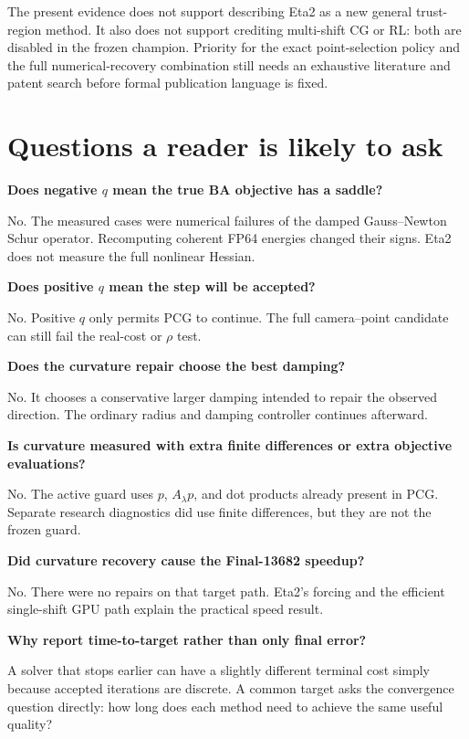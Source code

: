 \documentclass[11pt]{article}
\begin{document}
The present evidence does not support describing Eta2 as a new general trust-region method.  It also does not support crediting multi-shift CG or RL: both are disabled in the frozen champion.  Priority for the exact point-selection policy and the full numerical-recovery combination still needs an exhaustive literature and patent search before formal publication language is fixed.

\section{Questions a reader is likely to ask}

\textbf{Does negative $q$ mean the true BA objective has a saddle?}

No.  The measured cases were numerical failures of the damped Gauss--Newton Schur operator.  Recomputing coherent FP64 energies changed their signs.  Eta2 does not measure the full nonlinear Hessian.

\textbf{Does positive $q$ mean the step will be accepted?}

No.  Positive $q$ only permits PCG to continue.  The full camera--point candidate can still fail the real-cost or $\rho$ test.

\textbf{Does the curvature repair choose the best damping?}

No.  It chooses a conservative larger damping intended to repair the observed direction.  The ordinary radius and damping controller continues afterward.

\textbf{Is curvature measured with extra finite differences or extra objective evaluations?}

No.  The active guard uses $p$, $A_\lambda p$, and dot products already present in PCG.  Separate research diagnostics did use finite differences, but they are not the frozen guard.

\textbf{Did curvature recovery cause the Final-13682 speedup?}

No.  There were no repairs on that target path.  Eta2's forcing and the efficient single-shift GPU path explain the practical speed result.

\textbf{Why report time-to-target rather than only final error?}

A solver that stops earlier can have a slightly different terminal cost simply because accepted iterations are discrete.  A common target asks the convergence question directly: how long does each method need to achieve the same useful quality?
\end{document}
